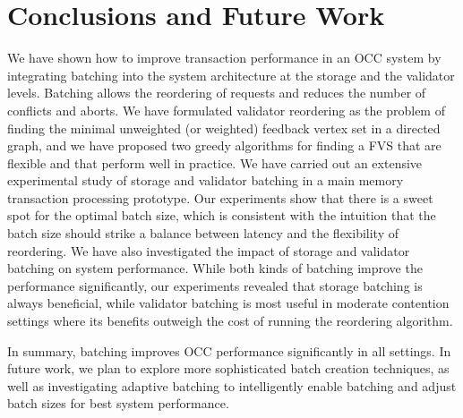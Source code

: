 \section{Conclusions and Future Work}\label{sec:conclusion}
We have shown how to improve transaction performance in an OCC system by integrating batching into the system architecture at the storage and the validator levels. Batching allows the reordering of requests and reduces the number of conflicts and aborts. We have formulated validator reordering as the problem of finding the minimal unweighted (or weighted) feedback vertex set in a directed graph, and we have proposed two greedy algorithms for finding a FVS that are flexible and that perform well in practice. We have carried out an extensive experimental study of storage and validator batching in a main memory transaction processing prototype. Our experiments show that there is a sweet spot for the optimal batch size, which is consistent with the intuition that the batch size should strike a balance between latency and the flexibility of reordering. We have also investigated the impact of storage and validator batching on system performance. While both kinds of batching improve the performance significantly, our experiments revealed that storage batching is always beneficial, while validator batching is most useful in moderate contention settings where its benefits outweigh the cost of running the reordering algorithm.

In summary, batching improves OCC performance significantly in all settings. In future work, we plan to explore more sophisticated batch creation techniques, as well as investigating adaptive batching to intelligently enable batching and adjust batch sizes for best system performance.


